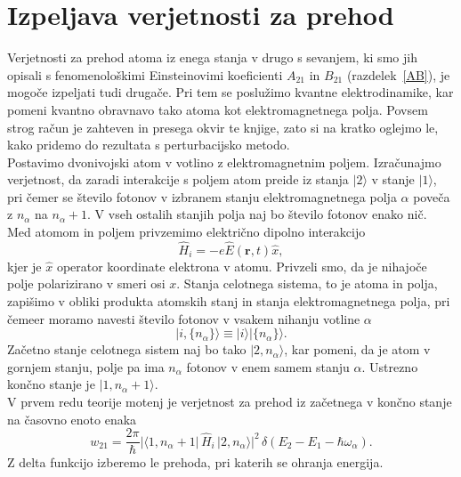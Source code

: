 \section{Izpeljava verjetnosti za prehod}
\label{chap:verjetnost}
Verjetnosti za prehod atoma iz enega stanja v drugo s sevanjem, ki
smo jih opisali s fenomenološkimi Einsteinovimi koeficienti $A_{21}$
in $B_{21}$ (razdelek~\ref{AB}), je mogoče izpeljati tudi drugače.
Pri tem se poslužimo kvantne elektrodinamike, kar pomeni kvantno obravnavo 
tako atoma kot elektromagnetnega polja. Povsem strog račun je zahteven in presega
okvir te knjige, zato si na kratko oglejmo le, kako pridemo do rezultata s
perturbacijsko metodo.\\

\noindent
Postavimo dvonivojski atom v votlino z elektromagnetnim poljem.
Izračunajmo verjetnost, da zaradi interakcije s poljem atom
preide iz stanja $|2\rangle$ v stanje $|1\rangle$, pri čemer se
število fotonov v izbranem stanju elektromagnetnega polja $\alpha$
poveča z $n_{\alpha}$ na $n_{\alpha}+1$. V vseh ostalih stanjih
polja naj bo število fotonov enako nič.\\

\noindent
Med atomom in poljem privzemimo električno dipolno interakcijo 
\begin{equation}
\hat{H}_{i}=-e\hat{E}(\mathbf{r},t)\hat{x},
\label{4.47}
\end{equation}
kjer je $\hat{x}$ operator koordinate elektrona v atomu. Privzeli
smo, da je nihajoče polje polarizirano v smeri osi $x$. Stanja celotnega sistema, 
to je atoma in polja, zapišimo v obliki produkta atomskih stanj in
stanja elektromagnetnega polja, pri čemeer moramo navesti število fotonov
v vsakem nihanju votline $\alpha$
\begin{equation}
|i,\{n_{\alpha}\}\rangle\equiv|i\rangle|\{n_{\alpha}\}\rangle.
\label{4.48}
\end{equation}
Začetno stanje celotnega sistem naj bo tako $|2,n_{\alpha}\rangle$, kar pomeni, da je
atom v gornjem stanju, polje pa ima $n_{\alpha}$ fotonov v enem samem stanju $\alpha$.
Ustrezno končno stanje je $|1,n_{\alpha}+1\rangle$.\\

\noindent
V prvem redu teorije motenj je verjetnost za prehod iz začetnega v končno stanje
na časovno enoto enaka
\begin{equation}
w_{21}=\frac{2\pi}{\hbar}|\langle1,n_{\alpha}+
1|\,\hat{H}_{i}\,|2,n_{\alpha}\rangle|^{2}\,
\delta(E_{2}-E_{1}-\hbar\omega_{\alpha}).
\label{4.49}
\end{equation}
Z delta funkcijo izberemo le prehoda, pri katerih se ohranja
energija.\\

